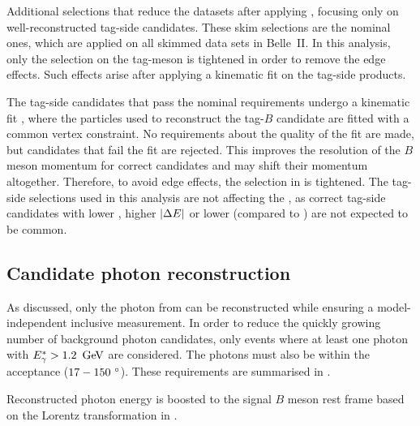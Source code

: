 \begin{table}[htbp!]
    \centering
     \caption{\label{tab:fei_skim_cuts} 
     Additional selections that reduce the datasets after applying \FEI, focusing only on well-reconstructed tag-side candidates.
     These \FEI skim selections are the nominal ones, which are applied on all \FEI skimmed data sets in Belle~II.
     In this analysis, only the selection on the tag-\B meson is tightened in order to remove the edge effects.
     Such effects arise after applying a kinematic fit on the tag-side products.
     }
     \resizebox{0.75\textwidth}{!}{
        
     }
\end{table}

The tag-side candidates that pass the nominal \FEI requirements undergo a kinematic fit \cite{Belle-IIanalysissoftwareGroup:2019dlq}, 
where the particles used to reconstruct the tag-$B$ candidate are fitted with a common vertex constraint.
No requirements about the quality of the fit are made, but candidates that fail the fit are rejected.
This improves the resolution of the $B$ meson momentum for correct candidates and may shift their momentum altogether.
Therefore, to avoid edge effects, the \Mbc selection in  is tightened.
The tag-side selections used in this analysis are not affecting the \BtoXsgamma, 
as correct tag-side candidates with 
lower \Mbc, 
higher $|{\Delta E}|$ 
or lower \feiProb (compared to ) are not expected to be common.


\subsection{Candidate photon reconstruction}\label{sec:gamma_reconstruction}

As discussed, only the photon from \BtoXsgamma can be reconstructed while ensuring a model-independent inclusive measurement.
In order to reduce the quickly growing number of background photon candidates, only events where at least one photon with ${E^*_{\gamma}}>1.2~\mathrm{\,Ge\kern -0.1em V}$ are considered.
The photons must also be within the \CDC acceptance ($17-150~^{\circ}$).
These requirements are summarised in .
\begin{table}[htbp!]
    \centering
     \caption{\label{tab:photon_requirements} Requirements for photons in reconstructed events.}
\end{table}
Reconstructed photon energy is boosted to the signal $B$ meson rest frame based on the Lorentz transformation in .

